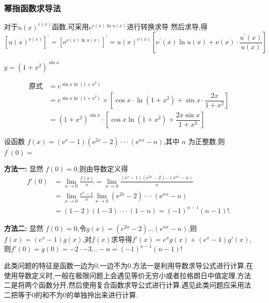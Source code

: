 \documentclass[8pt a4paper, oneside, UTF8]{ctexbook}  %
\begin{document}
\begin{sloppypar}
    \subsubsection{幂指函数求导法}
    对于$u(x)^{v(x)}$函数,可采用$e^{v(x)\ln u(x)}$进行转换求导
    然后求导,得
    $$
        \left[u(x)^{\nu(x)}\right]^{\prime}=\left[\mathrm{e}^{\nu(x)\ln u(x)}\right]^{\prime}=u(x)^{\nu(x)}\left[\nu^{\prime}(x)\ln u(x)+\nu(x)\cdot\frac{u^{\prime}(x)}{u(x)}\right]
    $$
    \begin{problem}
        $y=(1+x^2)^{\sin x}$
    \end{problem}
    \begin{solution}
        \begin{align*}
          \text{原式} & = e^{\sin x\ln(1+x^2)}\\
          & = e^{\sin x\ln(1+x^2)} \times [ \cos x \cdot \ln(1+x^2)+\sin x\cdot \dfrac{2x}{1+x^2}]\\
          & = (1+x^{2})^{\sin x}\cdot[\cos x\ln(1+x^{2})+\dfrac{2 x \sin x}{1+x^{2}}]
        \end{align*}
    \end{solution}
    \begin{problem}
        设函数 $f(x)=(\mathrm{e}^x-1)(\mathrm{e}^{2x}-2)\cdotp\cdotp\cdotp(\mathrm{e}^{nx}-n)$,其中 $n$ 为正整数,则 $f^{\prime}(0)=$
    \end{problem}
    \begin{solution}{\textbf{方法一:}}
        显然 $f(0)=0$,则由导数定义得
        \begin{align*}
            f'(0)&=\lim_{x\to0}\frac{f(x)}{x}=\lim_{x\to0}\frac{(\mathrm{e}^x-1)(\mathrm{e}^{2x}-2)\cdots(\mathrm{e}^{nx}-n)}{x}\\&=\lim_{x\to0}\frac{\mathrm{e}^x-1}{x}\lim_{x\to0}(\mathrm{e}^{2x}-2)\cdotp\cdotp\cdotp(\mathrm{e}^{nx}-n)\\&=(1-2)(1-3)\cdotp\cdotp\cdotp(1-n)=(-1)^{n-1}(n-1)!.
        \end{align*} 
    \end{solution}
    \begin{solution}{\textbf{方法二:}}
        显然 $f(0)=0$,令$g(x)=(e^{2x}-2)\dots(e^{nx}-n)$,则$f(x)=(e^x-1)g(x)$,对$f(x)$求导得$f'(x)=e^xg(x)+(e^x-1)g'(x)$,则$f'(0)=g(0)=-2\cdot-3 \dots -n=(-1)^{n-1}(n-1)!$  
    \end{solution}
    \begin{note}
        此类问题的特征是函数一边为0,一边不为0.方法一是利用导数求导公式进行计算,在使用导数定义时,一般在极限问题上会遇见等价无穷小或者拉格朗日中值定理.方法二是将两个函数分开,然后使用复合函数求导公式进行计算.遇见此类问题应采用法二把等于0的和不为0的单独拎出来进行计算.

\end{note}
\end{sloppypar}
\end{document}

